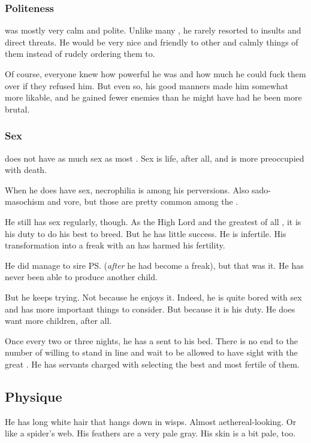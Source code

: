 \subsubsection{Politeness}
\Azraid{} was mostly very calm and polite. 
Unlike many \resphain, he rarely resorted to insults and direct threats. 
He would be very nice and friendly to other \resphain{} and calmly  things of them instead of rudely ordering them to.

Of course, everyone knew how powerful he was and how much he could fuck them over if they refused him. 
But even so, his good manners made him somewhat more likable, and he gained fewer enemies than he might have had he been more brutal. 





\subsubsection{Sex}
\Azraid{} does not have as much sex as most \resphain{}. 
Sex is life, after all, and \Azraid{} is more preoccupied with death. 

When he does have sex, necrophilia is among his perversions. 
Also sado-masochism and vore, but those are pretty common among the \resphain.  

He still has sex regularly, though. 
As the High Lord and the greatest of all \resphain, it is his duty to do his best to breed. 
But he has little success. 
He is infertile. 
His transformation into a freak with an  has harmed his fertility. 

He did manage to sire \ps{\Zereth} (\emph{after} he had become a freak), but that was it. 
He has never been able to produce another child. 

But he keeps trying. 
Not because he enjoys it. 
Indeed, he is quite bored with sex and has more important things to consider. 
But because it is his duty. 
He does want more children, after all. 

Once every two or three nights, he has a \resvil{} sent to his bed. 
There is no end to the number of \resviel{} willing to stand in line and wait to be allowed to have sight with the great \Azraid. 
He has servants charged with selecting the best and most fertile of them. 









\subsection{Physique}
He has long white hair that hangs down in wisps. 
Almost aethereal-looking. 
Or like a spider's web. 
His feathers are a very pale gray. 
His skin is a bit pale, too.

